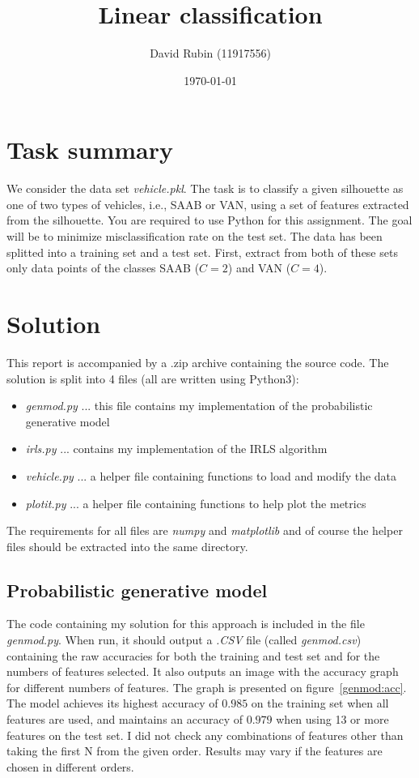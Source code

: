 \documentclass[a4paper,11pt]{article}
\title{Linear classification}
\author{David Rubin (11917556)}
\date{\today}
\begin{document}
\maketitle

\section{Task summary}

We consider the data set \textit{vehicle.pkl}. The task is to classify a given silhouette as
one of two types of vehicles, i.e., SAAB or VAN, using a set of features extracted from
the silhouette. You are required to use Python for this assignment. The goal will be to
minimize misclassification rate on the test set. The data has been splitted into a training
set and a test set. First, extract from both of these sets only data points of the classes
SAAB ($C = 2$) and VAN ($C = 4$).

\section{Solution}

This report is accompanied by a .zip archive containing the source code. The solution is split into 4 files (all are written using Python3):
\begin{itemize}
	\item \textit{genmod.py} ... this file contains my implementation of the probabilistic generative model
	\item \textit{irls.py} ... contains my implementation of the IRLS algorithm
	\item \textit{vehicle.py} ... a helper file containing functions to load and modify the data
	\item \textit{plotit.py} ... a helper file containing functions to help plot the metrics
\end{itemize}
The requirements for all files are \textit{numpy} and \textit{matplotlib} and of course the helper files should be extracted into the same directory.

\subsection{Probabilistic generative model}

The code containing my solution for this approach is included in the file \textit{genmod.py}. When run, it should output a \textit{.CSV} file (called \textit{genmod.csv}) containing the raw accuracies for both the training and test set and for the numbers of features selected. It also outputs an image with the accuracy graph for different numbers of features. The graph is presented on figure~\ref{genmod:acc}. The model achieves its highest accuracy of $0.985$ on the training set when all features are used, and maintains an accuracy of $0.979$ when using 13 or more features on the test set. I did not check any combinations of features other than taking the first N from the given order. Results may vary if the features are chosen in different orders.
\end{document}
